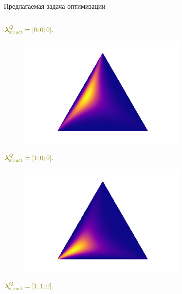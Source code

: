 \documentclass[10pt,pdf,utf8,russian,aspectratio=169]{beamer}
\begin{document}
\begin{frame}{Предлагаемая задача оптимизации}
\begin{columns}
\begin{column}{0.2\textwidth}
\begin{figure}
\end{figure}
\vspace{-0.2cm}
$ \textcolor{olive}{\boldsymbol{\lambda}_{\text{struct}}^Q=[0;0;0].}$
\begin{figure}
\centering
\includegraphics[width=0.75\textwidth]{combinations_2.png}
\end{figure}
\vspace{-0.2cm}
$ \textcolor{olive}{\boldsymbol{\lambda}_{\text{struct}}^Q=[1;0;0].}$
\begin{figure}
\centering
\includegraphics[width=0.75\textwidth]{combinations_3.png}
\end{figure}
\vspace{-0.2cm}
$ \textcolor{olive}{\boldsymbol{\lambda}_{\text{struct}}^Q=[1;1;0].}$
\end{column}
\end{columns}
\end{frame}
\end{document}

